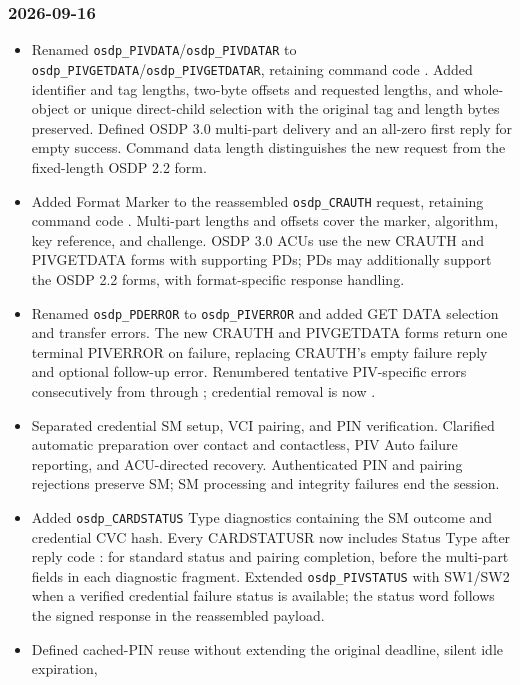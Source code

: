 \subsubsection*{2026-09-16}
\begin{itemize}
  \item Renamed \texttt{osdp\_PIVDATA}/\texttt{osdp\_PIVDATAR} to
    \texttt{osdp\_PIVGETDATA}/\texttt{osdp\_PIVGETDATAR}, retaining command code . Added
    identifier and tag lengths, two-byte offsets and requested lengths, and whole-object or unique
    direct-child selection with the original tag and length bytes preserved. Defined OSDP 3.0
    multi-part delivery and an all-zero first reply for empty success. Command data length
    distinguishes the new request from the fixed-length OSDP 2.2 form.
  \item Added Format Marker  to the reassembled \texttt{osdp\_CRAUTH} request, retaining
    command code . Multi-part lengths and offsets cover the marker, algorithm, key
    reference, and challenge. OSDP 3.0 ACUs use the new CRAUTH and PIVGETDATA forms with supporting
    PDs; PDs may additionally support the OSDP 2.2 forms, with format-specific response handling.
  \item Renamed \texttt{osdp\_PDERROR} to \texttt{osdp\_PIVERROR} and added GET DATA selection and
    transfer errors. The new CRAUTH and PIVGETDATA forms return one terminal PIVERROR on failure,
    replacing CRAUTH's empty failure reply and optional follow-up error. Renumbered tentative
    PIV-specific errors consecutively from  through ; credential removal
    is now .
  \item Separated credential SM setup, VCI pairing, and PIN verification. Clarified automatic
    preparation over contact and contactless, PIV Auto failure reporting, and ACU-directed recovery.
    Authenticated PIN and pairing rejections preserve SM; SM processing and integrity failures end
    the session.
  \item Added \texttt{osdp\_CARDSTATUS} Type  diagnostics containing the SM outcome and
    credential CVC hash. Every CARDSTATUSR now includes Status Type after reply code :
     for standard status and pairing completion,  before the multi-part fields
    in each diagnostic fragment. Extended \texttt{osdp\_PIVSTATUS} with SW1/SW2 when a verified
    credential failure status is available; the status word follows the signed response in the
    reassembled payload.
  \item Defined cached-PIN reuse without extending the original deadline, silent idle expiration,

\end{itemize}
